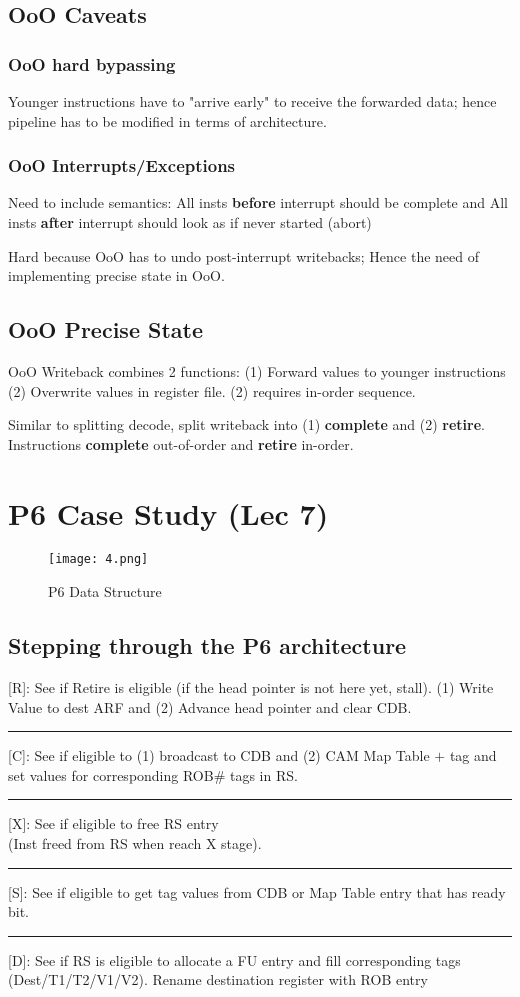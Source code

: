\documentclass{article}
\begin{document}
\begin{multicols*}{2}
\subsection*{OoO Caveats}
\subsubsection*{OoO hard bypassing}
Younger instructions have to "arrive early" to receive the forwarded data; hence pipeline has to be modified in terms of architecture.

\subsubsection*{OoO Interrupts/Exceptions}
Need to include semantics: All insts \textbf{before} interrupt should be complete and All insts \textbf{after} interrupt should look as if never started (abort)
\medskip\par\noindent
Hard because OoO has to undo post-interrupt writebacks; Hence the need of implementing precise state in OoO.

\subsection*{OoO Precise State}
OoO Writeback combines 2 functions: (1) Forward values to younger instructions (2) Overwrite values in register file. (2) requires in-order sequence.
\medskip\par\noindent
Similar to splitting decode, split writeback into (1) \textbf{complete} and (2) \textbf{retire}. Instructions \textbf{complete} out-of-order and \textbf{retire} in-order.

\section{P6 Case Study (Lec 7)}

\begin{figure}[H]
  \centering
    {\texttt{[image: 4.png]}}
  \caption{P6 Data Structure}
\end{figure}

\subsection*{Stepping through the P6 architecture}
[R]: See if Retire is eligible (if the head pointer is not here yet, stall). (1) Write Value to dest ARF and (2) Advance head pointer and clear CDB.
\smallskip\hrule\smallskip\noindent
{[C]}: See if eligible to (1) broadcast to CDB and (2) CAM Map Table $+$ tag and set values for corresponding ROB\# tags in RS.
\smallskip\hrule\smallskip\noindent
{[X]}: See if eligible to free RS entry \\ 
(Inst freed from RS when reach X stage). \smallskip\hrule\smallskip\noindent
{[S]}: See if eligible to get tag values from CDB or Map Table entry that has ready bit.
\smallskip\hrule\smallskip\noindent
{[D]}: See if RS is eligible to allocate a FU entry and fill corresponding tags (Dest/T1/T2/V1/V2). Rename destination register with ROB entry


\end{multicols*}
\end{document}
